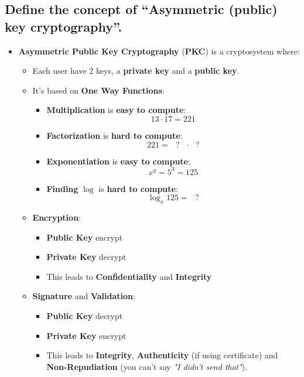 \documentclass[9pt, letterpaper]{article}
\begin{document}
\subsection{Define the concept of “Asymmetric (public) key cryptography”.}
\begin{itemize}
	\item \textbf{Asymmetric Public Key Cryptography} (\textbf{PKC}) is a cryptosystem where:
	\begin{itemize}
		\item Each user have $2$ keys, a \textbf{private key} and a \textbf{public key}.
		\item It's based on \textbf{One Way Functions}:
		\begin{itemize}
			\item \textbf{Multiplication} is \textbf{easy to compute}: $$ 13\cdot 17 = 221 $$
		\item \textbf{Factorization} is \textbf{hard to compute}: $$ 221 = \mbox{  } ? \mbox{ }\cdot \mbox{ } ? $$
		\item \textbf{Exponentiation} is \textbf{easy to compute}: $$ x^y = 5^3 = 125 $$
		\item \textbf{Finding} $\log$ is \textbf{hard to compute}: $$ \log_x125 = \mbox{ } ? $$
		\end{itemize}
		\item \textbf{Encryption}:
		\begin{itemize}
			\item \textbf{Public Key} encrypt
			\item \textbf{Private Key} decrypt
			\item This leads to \textbf{Confidentiality} and \textbf{Integrity}
		\end{itemize}
		\item \textbf{Signature} and \textbf{Validation}:
		\begin{itemize}
			\item \textbf{Public Key} decrypt
			\item \textbf{Private Key} encrypt
			\item This leads to \textbf{Integrity}, \textbf{Authenticity} (if using certificate) and \textbf{Non-Repudiation} (you can't say \textit{"I didn't send that"}).
		\end{itemize}
	\end{itemize}
\end{itemize}

\newpage
\end{document}
